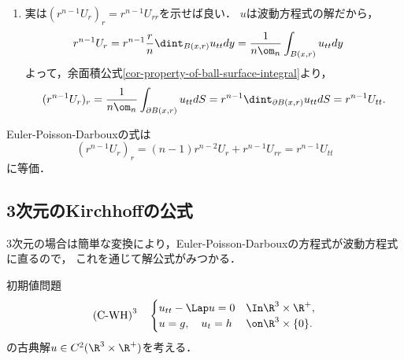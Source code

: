 \documentclass[uplatex,dvipdfmx]{jsreport}
\begin{document}
\begin{Proof}
\begin{enumerate}
        \item 実は$(r^{n-1}U_r)_r=r^{n-1}U_{rr}$を示せば良い．
        $u$は波動方程式の解だから，
        \begin{align*}
            r^{n-1}U_r&=r^{n-1}\frac{r}{n}\dint_{B(x,r)}u_{tt}dy=\frac{1}{n\om_n}\int_{B(x,r)}u_{tt}dy
        \end{align*}
        よって，余面積公式\ref{cor-property-of-ball-surface-integral}より，
        \[(r^{n-1}U_r)_r=\frac{1}{n\om_n}\int_{\partial B(x,r)}u_{tt}dS=r^{n-1}\dint_{\partial B(x,r)}u_{tt}dS=r^{n-1}U_{tt}.\]
    \end{enumerate}
\end{Proof}
\begin{remark}
    Euler-Poisson-Darbouxの式は
    \[(r^{n-1}U_r)_r=(n-1)r^{n-2}U_r+r^{n-1}U_{rr}=r^{n-1}U_{tt}\]
    に等価．
\end{remark}

\subsection{3次元のKirchhoffの公式}

\begin{tcolorbox}[colframe=ForestGreen, colback=ForestGreen!10!white,breakable,colbacktitle=ForestGreen!40!white,coltitle=black,fonttitle=\bfseries\sffamily,
title=]
    3次元の場合は簡単な変換により，Euler-Poisson-Darbouxの方程式が波動方程式に直るので，
    これを通じて解公式がみつかる．
\end{tcolorbox}

\begin{problem}
    初期値問題
    \[\text{(C-WH)}^{3}\quad\begin{cases}
        u_{tt}-\Lap u=0&\In\R^3\times\R^+,\\
        u=g,\quad u_t=h&\on\R^3\times\{0\}.
    \end{cases}\]
    の古典解$u\in C^2(\R^3\times\R^+)$を考える．
\end{problem}
\end{document}
